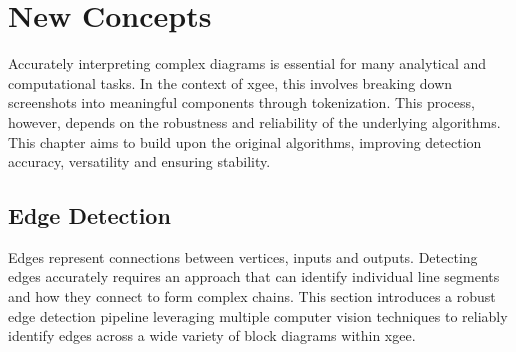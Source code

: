 \chapter{New Concepts}
\label{chap:new_concepts}
Accurately interpreting complex diagrams is essential for many analytical and computational tasks. In the context of \acrshort{xgee}, this involves breaking down screenshots into meaningful components through tokenization. This process, however, depends on the robustness and reliability of the underlying algorithms. This chapter aims to build upon the original algorithms, improving detection accuracy, versatility and ensuring stability.

\section{Edge Detection}
\label{sec:edge_detection}
Edges represent connections between vertices, inputs and outputs. Detecting edges accurately requires an approach that can identify individual line segments and how they connect to form complex chains. This section introduces a robust edge detection pipeline leveraging multiple computer vision techniques to reliably identify edges across a wide variety of block diagrams within \acrshort{xgee}.


